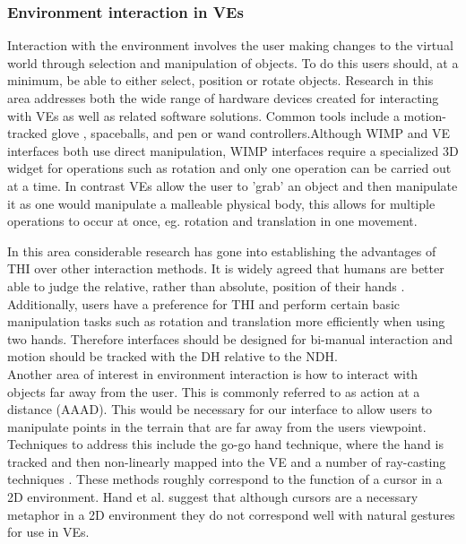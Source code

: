 \documentclass{sig-alternate-05-2015}
\begin{document}
\subsubsection{Environment interaction in VEs}
 Interaction with the environment involves the user making changes to the virtual world through selection and manipulation of objects. To do this users should, at a minimum, be able to either select, position or rotate objects\cite{Bowman2001}. Research in this area addresses both the wide range of hardware devices created for interacting with VEs as well as related software solutions. Common tools include a motion-tracked glove \cite{Zimmerman1986}, spaceballs\cite{Hand1997}, and pen or wand controllers\cite{Schultheis2012}.Although WIMP and VE interfaces both use direct manipulation, WIMP interfaces require a specialized 3D widget for operations such as rotation and only one operation can be carried out at a time. In contrast VEs allow the user to 'grab' an object and then manipulate it as one would manipulate a malleable physical body, this allows for multiple operations to occur at once, eg. rotation and translation in one movement.
  
 In this area considerable research has gone into establishing the advantages of THI over other interaction methods. It is widely agreed that humans are better able to judge the relative, rather than absolute, position of their hands \cite{Bowman1998, Buxton1986}. Additionally, users have a preference for THI\cite{Buxton1986} and perform certain basic manipulation tasks such as rotation and translation more efficiently when using two hands\cite{Schultheis2012,Balakrishnan1999}. Therefore interfaces should be designed for bi-manual interaction and motion should be tracked with the DH relative to the NDH\cite{Hinckley1994}.\\
 
 Another area of interest in environment interaction is how to interact with objects far away from the user. This is commonly referred to as action at a distance (AAAD). This would be necessary for our interface to allow users to manipulate points in the terrain that are far away from the users viewpoint. Techniques to address this include the go-go hand technique\cite{Poupyrev1996}, where the hand is tracked and then non-linearly mapped into the VE and a number of ray-casting techniques \cite{Bowman2001}. These methods roughly correspond to the function of a cursor in a 2D environment. Hand et al.\cite{Hand1997} suggest that although cursors are a necessary metaphor in a 2D environment they do not correspond well with natural gestures for use in VEs.
 
\end{document}

